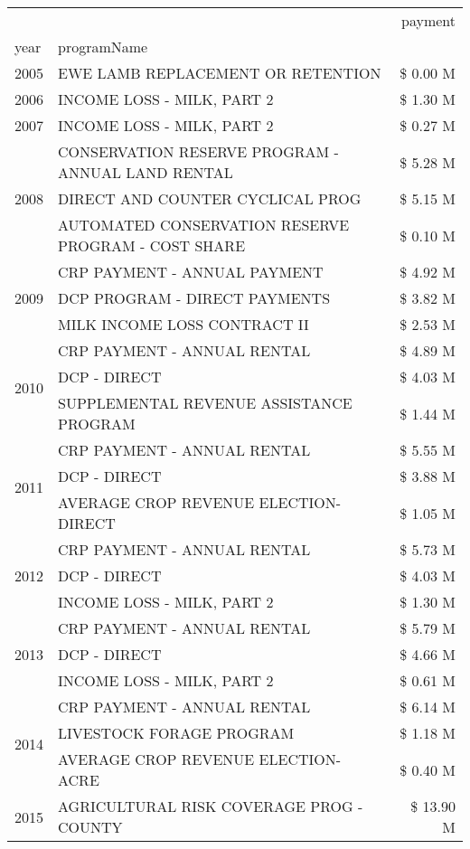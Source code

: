 \begin{tabular}{llr}
\toprule
 &  & payment \\
year & programName &  \\
\midrule
2005 & EWE LAMB REPLACEMENT OR RETENTION & \$ 0.00 M \\
\cline{1-3}
2006 & INCOME LOSS - MILK, PART 2 & \$ 1.30 M \\
\cline{1-3}
2007 & INCOME LOSS - MILK, PART 2 & \$ 0.27 M \\
\cline{1-3}
\multirow[t]{3}{*}{2008} & CONSERVATION RESERVE PROGRAM - ANNUAL LAND RENTAL & \$ 5.28 M \\
 & DIRECT AND COUNTER CYCLICAL PROG & \$ 5.15 M \\
 & AUTOMATED CONSERVATION RESERVE PROGRAM - COST SHARE & \$ 0.10 M \\
\cline{1-3}
\multirow[t]{3}{*}{2009} & CRP PAYMENT - ANNUAL PAYMENT & \$ 4.92 M \\
 & DCP PROGRAM - DIRECT PAYMENTS & \$ 3.82 M \\
 & MILK INCOME LOSS CONTRACT II & \$ 2.53 M \\
\cline{1-3}
\multirow[t]{3}{*}{2010} & CRP PAYMENT - ANNUAL RENTAL & \$ 4.89 M \\
 & DCP - DIRECT & \$ 4.03 M \\
 & SUPPLEMENTAL REVENUE ASSISTANCE PROGRAM & \$ 1.44 M \\
\cline{1-3}
\multirow[t]{3}{*}{2011} & CRP PAYMENT - ANNUAL RENTAL & \$ 5.55 M \\
 & DCP - DIRECT & \$ 3.88 M \\
 & AVERAGE CROP REVENUE ELECTION-DIRECT & \$ 1.05 M \\
\cline{1-3}
\multirow[t]{3}{*}{2012} & CRP PAYMENT - ANNUAL RENTAL & \$ 5.73 M \\
 & DCP - DIRECT & \$ 4.03 M \\
 & INCOME LOSS - MILK, PART 2 & \$ 1.30 M \\
\cline{1-3}
\multirow[t]{3}{*}{2013} & CRP PAYMENT - ANNUAL RENTAL & \$ 5.79 M \\
 & DCP - DIRECT & \$ 4.66 M \\
 & INCOME LOSS - MILK, PART 2 & \$ 0.61 M \\
\cline{1-3}
\multirow[t]{3}{*}{2014} & CRP PAYMENT - ANNUAL RENTAL & \$ 6.14 M \\
 & LIVESTOCK FORAGE PROGRAM & \$ 1.18 M \\
 & AVERAGE CROP REVENUE ELECTION-ACRE & \$ 0.40 M \\
\cline{1-3}
\multirow[t]{3}{*}{2015} & AGRICULTURAL RISK COVERAGE PROG - COUNTY & \$ 13.90 M \\

\end{tabular}

